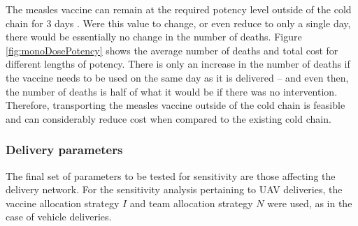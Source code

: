 The measles vaccine can remain at the required potency level outside of the cold chain for 3 days \cite{msf_ectc_2018}. Were this value to change, or even reduce to only a single day, there would be essentially no change in the number of deaths. Figure \ref{fig:monoDosePotency} shows the average number of deaths and total cost for different lengths of potency. There is only an increase in the number of deaths if the vaccine needs to be used on the same day as it is delivered -- and even then, the number of deaths is half of what it would be if there was no intervention. Therefore, transporting the measles vaccine outside of the cold chain is feasible and can considerably reduce cost when compared to the existing cold chain.

\subsubsection{Delivery parameters}
The final set of parameters to be tested for sensitivity are those affecting the delivery network. For the sensitivity analysis pertaining to UAV deliveries, the vaccine allocation strategy $I$ and team allocation strategy $N$ were used, as in the case of vehicle deliveries.

